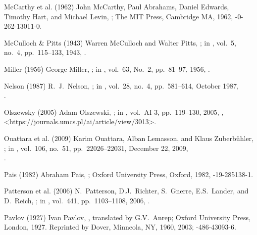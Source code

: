 \biblabel McCarthy et al. (1962)
John McCarthy, Paul Abrahams, Daniel Edwards,
Timothy Hart, and Michael Levin,
 ;
The MIT Press, Cambridge MA, 1962,
-0-262-13011-0.

\biblabel McCulloch \& Pitts (1943)
Warren McCulloch and Walter Pitts,
;
in ,
vol.\ 5, no.\ 4, pp.\ 115--133, 1943,
.

\biblabel Miller (1956)
 George Miller,
;
in ,
vol.\ 63, No.\ 2, pp.\ 81--97, 1956,
.

\biblabel Nelson (1987)
R.\ J.\ Nelson,
;
in ,
vol.\ 28, no.\ 4, pp.\ 581--614, October 1987,\\
.

\biblabel Olszewsky (2005)
Adam Olszewski,
;
in ,
vol.\ AI 3, pp.\ 119--130, 2005,
,
\URL<https://journals.umcs.pl/ai/article/view/3013>.

\biblabel Ouattara et al. (2009)
Karim Ouattara, Alban Lemasson, and Klaus Zuberbühler,\\
;
in ,
vol.\ 106, no.\ 51, pp.\ 22026--22031, December 22, 2009,\\
.

\biblabel Pais (1982)
Abraham Pais,
;
Oxford University Press, Oxford, 1982,
-19-285138-1.

\biblabel Patterson et al. (2006)
N.\ Patterson, D.J.\ Richter, S.\ Gnerre, E.S.\ Lander, and D.\ Reich,
;
in ,
vol.\ 441, pp.\ 1103--1108, 2006,
.

\biblabel Pavlov (1927)
Ivan Pavlov,
,
translated by G.V.\ Anrep;
Oxford University Press, London, 1927.
Reprinted by Dover, Minneola, NY, 1960, 2003;
-486-43093-6.

